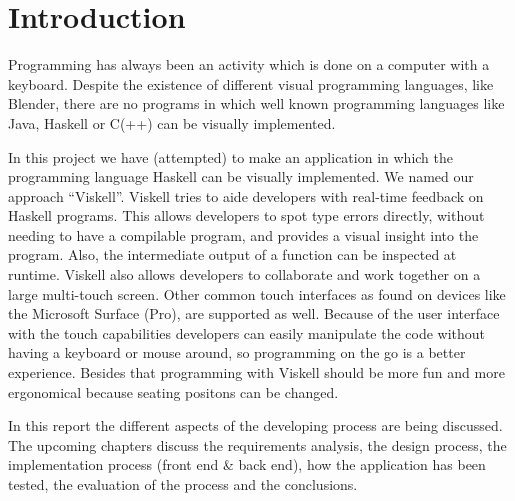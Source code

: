 \chapter{Introduction}

Programming has always been an activity which is done on a computer with a keyboard. Despite the existence of different visual programming languages, like Blender, there are no programs in which well known programming languages like Java, Haskell or C(++) can be visually implemented. 

In this project we have (attempted) to make an application in which the programming language Haskell can be visually implemented. We named our approach ``Viskell''. Viskell tries to aide developers with real-time feedback on Haskell programs. This allows developers to spot type errors directly, without needing to have a compilable program, and provides a visual insight into the program. Also, the intermediate output of a function can be inspected at runtime. Viskell also allows developers to collaborate and work together on a large multi-touch screen. Other common touch interfaces as found on devices like the Microsoft Surface (Pro), are supported as well. Because of the user interface with the touch capabilities developers can easily manipulate the code without having a keyboard or mouse around, so programming on the go is a better experience. Besides that programming with Viskell should be more fun and more ergonomical because seating positons can be changed.

In this report the different aspects of the developing process are being discussed. The upcoming chapters discuss the requirements analysis, the design process, the implementation process (front end \& back end), how the application has been tested, the evaluation of the process and the conclusions. 
